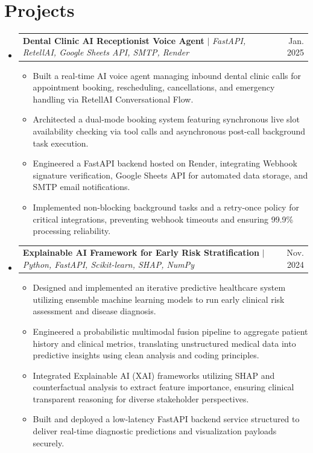 \documentclass[letterpaper,11pt]{article}
\makeatletter
\newcommand{\resumeItem}[1]{
  \item\small{
    {#1 \vspace{-2pt}}
  }
}
\newcommand{\resumeProjectHeading}[2]{
    \item
    \begin{tabular*}{0.97\textwidth}{l@{\extracolsep{\fill}}r}
      \small#1 & #2 \\
    \end{tabular*}\vspace{-7pt}
}
\newcommand{\resumeSubHeadingListStart}{\begin{itemize}[leftmargin=0.15in, label={}]}
\newcommand{\resumeSubHeadingListEnd}{\end{itemize}}
\newcommand{\resumeItemListStart}{\begin{itemize}}
\newcommand{\resumeItemListEnd}{\end{itemize}\vspace{-5pt}}
\makeatother
\begin{document}
\section{Projects}
    \resumeSubHeadingListStart
      \resumeProjectHeading
          {\textbf{Dental Clinic AI Receptionist Voice Agent} $|$ \emph{FastAPI, RetellAI, Google Sheets API, SMTP, Render}}{Jan. 2025}
          \resumeItemListStart
            \resumeItem{Built a real-time AI voice agent managing inbound dental clinic calls for appointment booking, rescheduling, cancellations, and emergency handling via RetellAI Conversational Flow.}
            \resumeItem{Architected a dual-mode booking system featuring synchronous live slot availability checking via tool calls and asynchronous post-call background task execution.}
            \resumeItem{Engineered a FastAPI backend hosted on Render, integrating Webhook signature verification, Google Sheets API for automated data storage, and SMTP email notifications.}
            \resumeItem{Implemented non-blocking background tasks and a retry-once policy for critical integrations, preventing webhook timeouts and ensuring 99.9\% processing reliability.}
          \resumeItemListEnd
      \resumeProjectHeading
          {\textbf{Explainable AI Framework for Early Risk Stratification} $|$ \emph{Python, FastAPI, Scikit-learn, SHAP, NumPy}}{Nov. 2024}
          \resumeItemListStart
            \resumeItem{Designed and implemented an iterative predictive healthcare system utilizing ensemble machine learning models to run early clinical risk assessment and disease diagnosis.}
            \resumeItem{Engineered a probabilistic multimodal fusion pipeline to aggregate patient history and clinical metrics, translating unstructured medical data into predictive insights using clean analysis and coding principles.}
            \resumeItem{Integrated Explainable AI (XAI) frameworks utilizing SHAP and counterfactual analysis to extract feature importance, ensuring clinical transparent reasoning for diverse stakeholder perspectives.}
            \resumeItem{Built and deployed a low-latency FastAPI backend service structured to deliver real-time diagnostic predictions and visualization payloads securely.}
          \resumeItemListEnd
    \resumeSubHeadingListEnd

\end{document}
